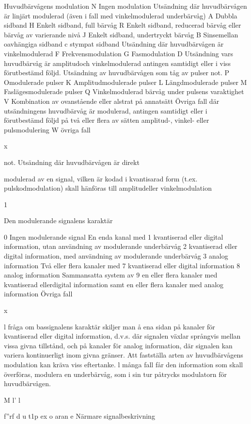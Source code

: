 Huvudbärvågens modulation
N Ingen modulation
Utsändning där huvudbärvågen är linjärt modulerad
(även i fall med vinkelmodulerad underbärvåg)
A Dubbla sidband
H Enkelt sidband, full bärvåg
R Enkelt sidband, reducerad bärvåg eller bärvåg av varierande nivå
J Enkelt sidband, undertryckt bärvåg
B Sinsemellan oavhängiga sidband
c stympat sidband
Utsändning där huvudbärvågen är vinkelmodulerad
F Frekvensmodulation
G Fasmodulation
D Utsändning vars huvudbärvåg är amplitudoch vinkelmodulerad antingen samtidigt eller
i viss förutbestämd följd.
Utsändning av huvudbärvågen som tåg av pulser not.
P Omodulerade pulser
K Amplitudmodulerade pulser
L Längdmodulerade pulser
M Faslägesmodulerade pulser
Q Vinkelmodulerad bärvåg under pulsens varaktighet
V Kombination av ovanstående eller alstrat på
annatsätt
Övriga fall där utsändningens huvudbärvåg är modulerad, antingen samtidigt eller i förutbestämd följd på
två eller flera av sätten amplitud-, vinkel- eller pulsmodulering
W
övriga fall

x

not. Utsändning där huvudbärvågen är direkt

modulerad av en signal, vilken är kodad
i kvantisarad form (t.ex. pulskodmodulation) skall hänföras till amplitudeller vinkelmodulation

1

Den modulerande signalens karaktär

0 Ingen modulerande signal
En enda kanal med
1 kvantiserad eller digital information, utan användning av modulerande underbärvåg
2 kvantiserad eller digital information, med användning av modulerande underbärvåg
3 analog information
Två eller flera kanaler med
7 kvantiserad eller digital information
8 analog information
Sammansatta system av
9 en eller flera kanaler med kvantiserad ellerdigital information samt
en eller flera kanaler med analog
information
Övriga fall

x

l fråga om bassignalens karaktär skiljer
man å ena sidan på kanaler för kvantiserad eller digital information, d.v.s. där signalen växlar språngvis mellan vissa givna tillstånd, och på kanaler för analog information, där signalen kan variera kontinuerligt inom givna gränser.
Att fastställa arten av huvudbärvågens modulation kan kräva viss eftertanke. l många fall
får den information som skall överföras, modulera en underbärvåg, som i sin tur påtrycks
modulatorn för huvudbärvågen.

M l' l

f''rf
d
u t1p ex o aran e
Närmare signalbeskrivning

